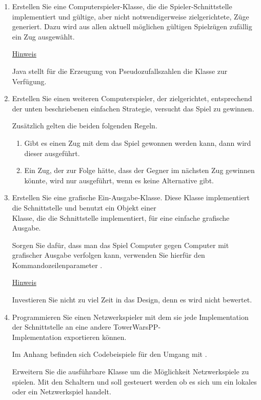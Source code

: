 \begin{enumerate}
\item Erstellen Sie eine Computerspieler-Klasse, die die Spieler-Schnittstelle implementiert und gültige, aber nicht notwendigerweise zielgerichtete, Züge generiert. Dazu wird aus allen aktuell möglichen gültigen Spielzügen zufällig ein Zug ausgewählt.

\underline{Hinweis}

Java stellt für die Erzeugung von Pseudozufallszahlen die Klasse  zur Verfügung.

\item Erstellen Sie einen weiteren Computerspieler, der zielgerichtet, entsprechend der unten beschriebenen einfachen Strategie, versucht das Spiel zu gewinnen.

Zusätzlich gelten die beiden folgenden Regeln.
\begin{enumerate}[label=\alph*)]
\item Gibt es einen Zug mit dem das Spiel gewonnen werden kann, dann wird dieser ausgeführt.
\item Ein Zug, der zur Folge hätte, dass der Gegner im nächsten Zug gewinnen könnte, wird nur ausgeführt, wenn es keine Alternative gibt.
\end{enumerate}

\item Erstellen Sie eine grafische Ein-Ausgabe-Klasse. Diese Klasse implementiert die Schnittstelle  und benutzt ein Objekt einer \\Klasse, die die Schnittstelle  implementiert, für eine einfache grafische Ausgabe.

Sorgen Sie dafür, dass man das Spiel Computer gegen Computer mit grafischer Ausgabe verfolgen kann, verwenden Sie hierfür den Kommandozeilenparameter .

\underline{Hinweis}

Investieren Sie nicht zu viel Zeit in das Design, denn es wird nicht bewertet.

\item Programmieren Sie einen Netzwerkspieler mit dem sie jede Implementation der Schnittstelle  an eine andere TowerWarsPP- \\Implementation exportieren können.

Im Anhang befinden sich Codebeispiele für den Umgang mit .

Erweitern Sie die ausführbare Klasse um die Möglichkeit Netzwerkspiele zu spielen. Mit den Schaltern  und  soll gesteuert werden ob es sich um ein lokales oder ein Netzwerkspiel handelt. 


\end{enumerate}
